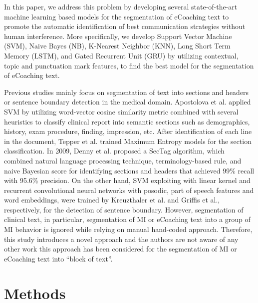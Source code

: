 \documentclass{amia}
\begin{document}
In this paper, we address this problem by developing several state-of-the-art machine learning based models for the segmentation of eCoaching text to promote the automatic identification of best communication strategies without human interference. More specifically, we develop Support Vector Machine (SVM), Naive Bayes (NB), K-Nearest Neighbor (KNN), Long Short Term Memory (LSTM), and Gated Recurrent Unit (GRU) by utilizing contextual, topic and punctuation mark features, to find the best model for the segmentation of eCoaching text. 

Previous studies mainly focus on segmentation of text into sections and headers\cite{apostolova2009automatic,denny2009evaluation,tepper2012statistical,cho2002text} or sentence boundary detection\cite{griffis2016quantitative,kreuzthaler2015detection,treviso2016sentence} in the medical domain. Apostolova et al.\cite{apostolova2009automatic} applied SVM by utilizing word-vector cosine similarity metric combined with several heuristics to classify clinical report into semantic sections such as demographics, history, exam procedure, finding, impression, etc. After identification of each line in the document, Tepper et al. \cite{tepper2012statistical} trained Maximum Entropy models for the section classification. In 2009, Denny et al.\cite{denny2009evaluation} proposed a SecTag algorithm, which combined natural language processing technique, terminology-based rule, and naive Bayesian score for identifying sections and headers that achieved 99\% recall with 95.6\% precision. On the other hand, SVM exploiting with linear kernel and recurrent convolutional neural networks with posodic, part of speech features and word embeddings, were trained by Kreuzthaler et al.\cite{kreuzthaler2015detection} and Griffis et al.\cite{griffis2016quantitative}, respectively, for the detection of sentence boundary. However, segmentation of clinical text, in particular, segmentation of MI or eCoaching text into a group of MI behavior is ignored while relying on manual hand-coded approach. Therefore, this study introduces a novel approach and the authors are not aware of any other work this approach has been considered for the segmentation of MI or eCoaching text into ``block of text''.  

\section*{Methods}
\end{document}

